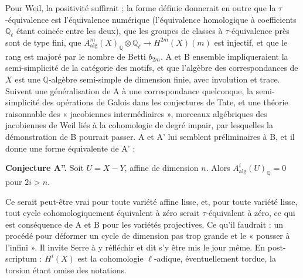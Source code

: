 \documentclass[11pt,a4paper]{article}
\begin{document}
Pour Weil, la positivité suffirait ; la forme définie donnerait en outre que la
$\tau$-équivalence est l'équivalence numérique (l'équivalence homologique à
coefficients $\mathbb{Q}_{\ell}$ étant coincée entre les deux), que les
groupes de classes à $\tau$-équivalence près sont de type fini, que
$A^{m}_{\mathrm{alg}}(X)_{\mathbb{Q}} \otimes \mathbb{Q}_{\ell} \to H^{2m}(X)(m)$
est injectif, et que le rang est majoré par le nombre de Betti $b_{2m}$. A et B
ensemble impliqueraient la semi-simplicité de la catégorie des motifs, et que
l'algèbre des correspondances de $X$ est une $\mathbb{Q}$-algèbre semi-simple de
dimension finie, avec involution et trace. Suivent une généralisation de A à une
correspondance quelconque, la semi-simplicité des opérations de Galois dans les
conjectures de Tate, et une théorie raisonnable des « jacobiennes
intermédiaires », morceaux algébriques des jacobiennes de Weil liés à la
cohomologie de degré impair, par lesquelles la démonstration de B pourrait
passer. A et A' lui semblent préliminaires à B, et il donne une forme
équivalente de A' :

\textbf{Conjecture A''.} Soit $U = X - Y$, affine de dimension $n$. Alors
$A^{i}_{\mathrm{alg}}(U)_{\mathbb{Q}} = 0$ pour $2i > n$.

Ce serait peut-être vrai pour toute variété affine lisse, et, pour toute variété
lisse, tout cycle cohomologiquement équivalent à zéro serait $\tau$-équivalent à
zéro, ce qui est conséquence de A et B pour les variétés projectives. Ce qu'il faudrait :
un procédé pour déformer un cycle de dimension pas trop grande et le « pousser
à l'infini ». Il invite Serre à y réfléchir et dit s'y être mis le jour même. En
post-scriptum : $H^{i}(X)$ est la cohomologie $\ell$-adique, éventuellement
tordue, la torsion étant omise des notations.
\end{document}
